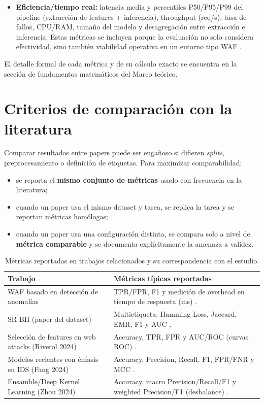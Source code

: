\documentclass[12pt,oneside]{report}
\begin{document}
\begin{itemize}[leftmargin=*]
  \item \textbf{Eficiencia/tiempo real:} latencia media y percentiles P50/P95/P99 del pipeline (extracción de features + inferencia), throughput (req/s), tasa de fallos, CPU/RAM, tamaño del modelo y desagregación entre extracción e inferencia. Estas métricas se incluyen porque la evaluación no solo considera efectividad, sino también viabilidad operativa en un entorno tipo WAF \cite{ocswaf_zenodo}.
\end{itemize}

El detalle formal de cada métrica y de su cálculo exacto se encuentra en la sección de fundamentos matemáticos del Marco teórico.

\section{Criterios de comparación con la literatura}
Comparar resultados entre papers puede ser engañoso si difieren \textit{splits}, preprocesamiento o definición de etiquetas. Para maximizar comparabilidad:
\begin{itemize}[leftmargin=*]
  \item se reporta el \textbf{mismo conjunto de métricas} usado con frecuencia en la literatura;
  \item cuando un paper usa el mismo dataset y tarea, se replica la tarea y se reportan métricas homólogas;
  \item cuando un paper usa una configuración distinta, se compara solo a nivel de \textbf{métrica comparable} y se documenta explícitamente la amenaza a validez.
\end{itemize}

\begin{table}[H]
\centering
\caption{Métricas reportadas en trabajos relacionados y su correspondencia con el estudio.}
\label{tab:metricas_relacionadas}
\footnotesize
\setlength{\tabcolsep}{5pt}
\renewcommand{\arraystretch}{1.2}
\begin{tabularx}{\textwidth}{@{}L{3.6cm}Y@{}}
\toprule
\textbf{Trabajo} & \textbf{Métricas típicas reportadas} \\
\midrule
WAF basado en detección de anomalías & TPR/FPR, F1 y medición de overhead en tiempo de respuesta (ms) \cite{ocswaf_zenodo}. \\
SR-BH (paper del dataset) & Multietiqueta: Hamming Loss, Jaccard, EMR, F1 y AUC \cite{srbh_paper}. \\
Selección de features en web attacks (Riverol 2024) & Accuracy, TPR, FPR y AUC/ROC (curvas ROC) \cite{riverol_2024}. \\
Modelos recientes con énfasis en IDS (Fang 2024) & Accuracy, Precision, Recall, F1, FPR/FNR y MCC \cite{fang_2024,chicco_mcc}. \\
Ensamble/Deep Kernel Learning (Zhou 2024) & Accuracy, macro Precision/Recall/F1 y weighted Precision/F1 (desbalance) \cite{zhou_2024}. \\
\bottomrule
\end{tabularx}
\end{table}
\end{document}
